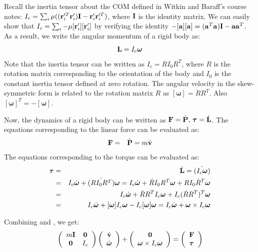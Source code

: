 Recall the inertia tensor about the COM defined in Witkin and
Baraff's course notes: $I_c = \sum_i \mathbf{\mu} ((\mathbf{r}_i'^T
\mathbf{r}_i')\mathbf{I} - \mathbf{r}_i' \mathbf{r}_i'^T)$, where $\mathbf{I}$ is the
identity matrix. We can easily show that
$I_c = \sum_i -\mathbf{\mu} [\mathbf{r}_i'][\mathbf{r}_i']$ by verifying the
identity $-[\mathbf{a}][\mathbf{a}] = (\mathbf{a}^T\mathbf{a}) \mathbf{I}  -
\mathbf{a}\mathbf{a}^T$. As a result, we write the angular momentum of a rigid body as:
\begin{equation}
\mathbf{L} = I_c \bm{\omega}
\end{equation}
Note that the inertia tensor can be written as $I_c = RI_0R^T$, where $R$ is the rotation matrix corresponding to the orientation of the body and $I_0$ is the constant inertia tensor defined at zero rotation. The angular velocity in the skew-symmetric form is related to the rotation matrix $R$ as $[\bm{\omega}] = \dot{R}R^T$. Also $[\bm{\omega}]^T = -[\bm{\omega}]$.

Now, the dynamics of a rigid body can be written as $\mathbf{F} = \dot{\mathbf{P}} \mbox{,\ } \bm{\tau} = \dot{\mathbf{L}}$. The equations corresponding to the linear force can be evaluated as:
\begin{eqnarray}
\label{eq:force}
\mathbf{F} & = & \dot{\mathbf{P}} = m \dot{\mathbf{v}}
\end{eqnarray}
The equations corresponding to the torque can be evaluated as:
\begin{eqnarray}
\label{eq:torque}
\nonumber
\bm{\tau} & = & \dot{\mathbf{L}} = \dot{(I_c \bm{\omega})} \\
\nonumber
& = & I_c\dot{\bm{\omega}} + \dot{(RI_0 R^T)}\bm{\omega} = I_c\dot{\bm{\omega}} + \dot{R}I_0 R^T\bm{\omega} + R I_0 \dot{R}^T\bm{\omega}\\
\nonumber
& = & I_c\dot{\bm{\omega}} + \dot{R}R^T I_c \bm{\omega} + I_c (\dot{R}R^T)^T\bm{\omega} \\
& = & I_c\dot{\bm{\omega}} + [\bm{\omega}]I_c \bm{\omega} - I_c[\bm{\omega}]\bm{\omega} = I_c\dot{\bm{\omega}} + \bm{\omega} \times I_c \bm{\omega}
\end{eqnarray}

Combining  and , we get:
\begin{equation}
\left(
\begin{array}{cc}
m\mathbf{I} & \mathbf{0} \\
\mathbf{0} & I_c 
\end{array}
\right)
\left(
\begin{array}{c}
\dot{\mathbf{v}} \\
\dot{\bm{\omega}} 
\end{array}
\right) +
\left(
\begin{array}{c}
\mathbf{0}  \\
\bm{\omega} \times I_c \bm{\omega} 
\end{array}
\right) = 
\left(
\begin{array}{c}
\mathbf{F} \\
\bm{\tau} 
\end{array}
\right)
\end{equation}

